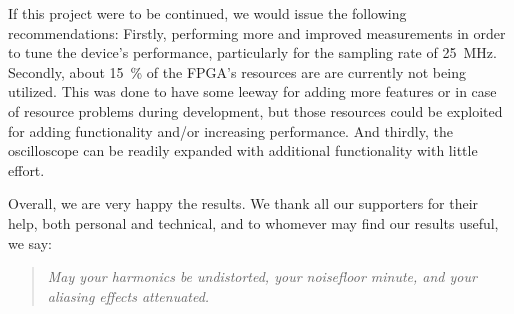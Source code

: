 If  this  project  were  to  be   continued,  we  would  issue  the  following
recommendations: Firstly, performing  more and improved measurements  in order
to  tune the  device's  performance,  particularly for  the  sampling rate  of
\SI{25}{\MHz}.  Secondly, about \SI{15}{\percent}  of the FPGA's resources are
are  currently not  being utilized.   This was  done to  have some  leeway for
adding more features  or in case of resource problems  during development, but
those resources could be exploited  for adding functionality and/or increasing
performance. And  thirdly,  the  oscilloscope  can be  readily  expanded  with
additional functionality with little effort.

Overall, we are very happy the  results. We thank all our supporters for their
help,  both personal  and  technical, and  to whomever  may  find our  results
useful, we say:
\begin{quote}
\centering
\emph{%
    May  your  harmonics be  undistorted,  your  noisefloor minute,  and  your
    aliasing effects attenuated.%
}
\end{quote}
